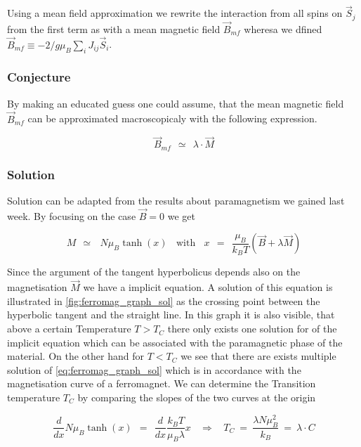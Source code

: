 \documentclass[10pt]{report}
\numberwithin{equation}{chapter}
\begin{document}
Using a mean field approximation we rewrite the interaction from all spins on $\vec{S}_j$ from the first term as with a mean magnetic field $\vec{B}_{mf}$ wheresa we dfined $\vec{B}_{mf} \equiv -2/g \mu_B \sum_i J_{ij} \vec{S}_i$. 

\subsubsection{Conjecture}

By making an educated guess one could assume, that the mean magnetic field $\vec{B}_{mf}$ can be approximated macroscopicaly with the following expression.

\begin{equation}
  \vec{B}_{mf} ~~≃~~ \lambda \cdot \vec{M}
\end{equation}


\subsubsection{Solution}

Solution can be adapted from the results about paramagnetism we gained last week. By focusing on the case $\vec{B} = 0$ we get

\begin{equation} \label{eq:ferromag_graph_sol}
  M ~~≃~~~ N \mu_B \tanh(x) ~~~~ \text{with} ~~~~ x ~~=~~\frac{\mu_B}{k_BT} (\vec{B} + \lambda \vec{M})
\end{equation}

Since the argument of the tangent hyperbolicus depends also on the magnetisation $\vec{M}$ we have a implicit equation. A solution of this equation is illustrated in \ref{fig:ferromag_graph_sol} as the crossing point between the hyperbolic tangent and the straight line. In this graph it is also visible, that above a certain Temperature $T>T_C$ there only exists one solution for of the implicit equation which can be associated with the paramagnetic phase of the material. On the other hand for $T<T_C$ we see that there are exists multiple solution of \ref{eq:ferromag_graph_sol} which is in accordance with the magnetisation curve of a ferromagnet. We can determine the Transition temperature $T_C$ by comparing the slopes of the two curves at the origin

\begin{equation}
  \frac{d}{dx} N \mu_B \tanh(x) ~~ = ~~ \frac{d}{dx} \frac{k_BT}{\mu_B \lambda} x ~~~~ \Rightarrow ~~~~
  T_C ~=~\frac{\lambda N \mu_B^2}{k_B} ~=~ \lambda \cdot C
\end{equation}
\end{document}
